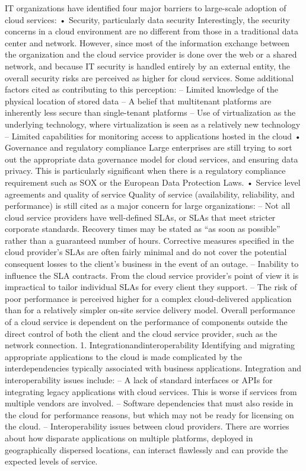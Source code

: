 IT organizations have identified four major barriers to large-scale adoption of cloud services:
•  Security, particularly data security
Interestingly, the security concerns in a cloud environment are no different from those in a traditional data center and network. However, since most of the information exchange between the organization and the cloud service provider is done over the web or a shared network, and because IT security is handled entirely by an external entity, the overall security risks are perceived as higher for cloud services.
Some additional factors cited as contributing to this perception:
– Limited knowledge of the physical location of stored data
– A belief that multitenant platforms are inherently less secure than single-tenant platforms
– Use of virtualization as the underlying technology, where virtualization is seen as a relatively new technology
– Limited capabilities for monitoring access to applications hosted in the cloud
•  Governance and regulatory compliance
Large enterprises are still trying to sort out the appropriate data governance model for cloud services, and ensuring data privacy. This is particularly significant when there is a regulatory compliance requirement such as SOX or the European Data Protection Laws.
•  Service level agreements and quality of service
Quality of service (availability, reliability, and performance) is still cited as a
major concern for large organizations:
– Not all cloud service providers have well-defined SLAs, or SLAs that meet stricter corporate standards. Recovery times may be stated as “as soon as possible” rather than a guaranteed number of hours. Corrective measures specified in the cloud provider's SLAs are often fairly minimal and do not cover the potential consequent losses to the client's business in the event of an outage.
– Inability to influence the SLA contracts. From the cloud service provider's point of view it is impractical to tailor individual SLAs for every client they support.
– The risk of poor performance is perceived higher for a complex cloud-delivered application than for a relatively simpler on-site service delivery model. Overall performance of a cloud service is dependent on the performance of components outside the direct control of both the client and the cloud service provider, such as the network connection.
1. Integrationandinteroperability
Identifying and migrating appropriate applications to the cloud is made complicated by the interdependencies typically associated with business applications. Integration and interoperability issues include:
– A lack of standard interfaces or APIs for integrating legacy applications with cloud services. This is worse if services from multiple vendors are involved.
– Software dependencies that must also reside in the cloud for performance reasons, but which may not be ready for licensing on the cloud.
– Interoperability issues between cloud providers. There are worries about how disparate applications on multiple platforms, deployed in geographically dispersed locations, can interact flawlessly and can provide the expected levels of service.


